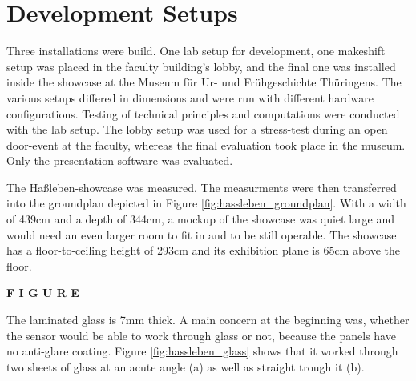 
%


\section{Development Setups}
\label{setup_development}

Three installations were build. One lab setup for development, one makeshift setup was placed in the faculty building's lobby, and the final one was installed inside the showcase at the Museum für Ur- und Frühgeschichte Thüringens. The various setups differed in dimensions and were run with different hardware configurations. Testing of technical principles and computations were conducted with the lab setup. The lobby setup was used for a stress-test during an open door-event at the faculty, whereas the final evaluation took place in the museum. Only the presentation software was evaluated.

The Haßleben-showcase was measured. The measurments were then transferred into the groundplan depicted in Figure \ref{fig:hassleben_groundplan}. With a width of 439cm and a depth of 344cm, a mockup of the showcase was quiet large and would need an even larger room to fit in and to be still operable. The showcase has a floor-to-ceiling height of 293cm and its exhibition plane is 65cm above the floor.

\textbf{F I G U R E}

The laminated glass is 7mm thick. A main concern at the beginning was, whether the sensor would be able to work through glass or not, because the panels have no anti-glare coating. Figure \ref{fig:hassleben_glass} shows that it worked through two sheets of glass at an acute angle (a) as well as straight trough it (b).

